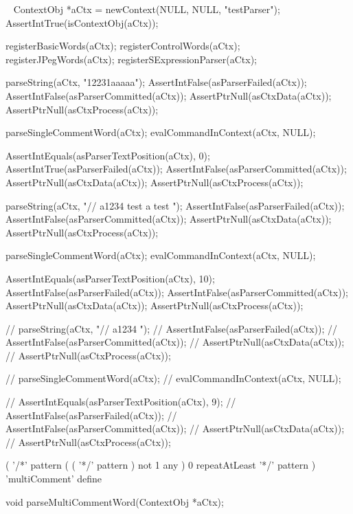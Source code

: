 \CTestsSuiteSetup\
\startCTest
  ContextObj *aCtx = newContext(NULL, NULL, "testParser");
  AssertIntTrue(isContextObj(aCtx));
  
  registerBasicWords(aCtx);
  registerControlWords(aCtx);
  registerJPegWords(aCtx);
  registerSExpressionParser(aCtx);
\stopCTest

\startCTest
  parseString(aCtx, "12231aaaaa");
  AssertIntFalse(asParserFailed(aCtx));
  AssertIntFalse(asParserCommitted(aCtx));
  AssertPtrNull(asCtxData(aCtx));
  AssertPtrNull(asCtxProcess(aCtx));

  parseSingleCommentWord(aCtx);
  evalCommandInContext(aCtx, NULL);
  
  AssertIntEquals(asParserTextPosition(aCtx), 0);
  AssertIntTrue(asParserFailed(aCtx));
  AssertIntFalse(asParserCommitted(aCtx));
  AssertPtrNull(asCtxData(aCtx));
  AssertPtrNull(asCtxProcess(aCtx));
\stopCTest
\stopTestCase

\startCTest
  parseString(aCtx, "// a1234 \n test a test ");
  AssertIntFalse(asParserFailed(aCtx));
  AssertIntFalse(asParserCommitted(aCtx));
  AssertPtrNull(asCtxData(aCtx));
  AssertPtrNull(asCtxProcess(aCtx));
  
  parseSingleCommentWord(aCtx);
  evalCommandInContext(aCtx, NULL);

  AssertIntEquals(asParserTextPosition(aCtx), 10);
  AssertIntFalse(asParserFailed(aCtx));
  AssertIntFalse(asParserCommitted(aCtx));
  AssertPtrNull(asCtxData(aCtx));
  AssertPtrNull(asCtxProcess(aCtx));

//  parseString(aCtx, "// a1234 ");
//  AssertIntFalse(asParserFailed(aCtx));
//  AssertIntFalse(asParserCommitted(aCtx));
//  AssertPtrNull(asCtxData(aCtx));
//  AssertPtrNull(asCtxProcess(aCtx));
  
//  parseSingleCommentWord(aCtx);
//  evalCommandInContext(aCtx, NULL);

//  AssertIntEquals(asParserTextPosition(aCtx), 9);
//  AssertIntFalse(asParserFailed(aCtx));
//  AssertIntFalse(asParserCommitted(aCtx));
//  AssertPtrNull(asCtxData(aCtx));
//  AssertPtrNull(asCtxProcess(aCtx));
\stopCTest
\stopTestCase
\stopTestSuite

\startTestSuite[parseMultiCommentWord]

\starttyping
(
  '/*' pattern
  ( ( '*/' pattern ) not 1 any ) 0 repeatAtLeast
  '*/' pattern
) 'multiComment' define
\stoptyping

\startCHeader
void parseMultiCommentWord(ContextObj *aCtx);
\stopCHeader

